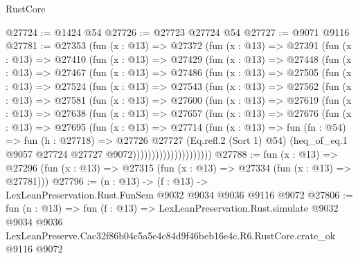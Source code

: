 \begin{lexlean}{RustCore}
\begin{coremodule}
@27724 := @1424 @54
@27726 := @27723 @27724 @54
@27727 := @9071 @9116
@27781 := @27353
    (fun (x : @13) =>
    @27372
      (fun (x : @13) =>
      @27391
        (fun (x : @13) =>
        @27410
          (fun (x : @13) =>
          @27429
            (fun (x : @13) =>
            @27448
              (fun (x : @13) =>
              @27467
                (fun (x : @13) =>
                @27486
                  (fun (x : @13) =>
                  @27505
                    (fun (x : @13) =>
                    @27524
                      (fun (x : @13) =>
                      @27543
                        (fun (x : @13) =>
                        @27562
                          (fun (x : @13) =>
                          @27581
                            (fun (x : @13) =>
                            @27600
                              (fun (x : @13) =>
                              @27619
                                (fun (x : @13) =>
                                @27638
                                  (fun (x : @13) =>
                                  @27657
                                    (fun (x : @13) =>
                                    @27676
                                      (fun (x : @13) =>
                                      @27695
                                        (fun (x : @13) =>
                                        @27714
                                          (fun (x : @13) =>
                                          fun (fn : @54) =>
                                          fun (h : @27718) =>
                                          @27726
                                            @27727
                                            (Eq.refl.{2} (Sort 1) @54)
                                            (heq_of_eq.{1}
                                              @9057
                                              @27724
                                              @27727
                                              @9072)))))))))))))))))))))
@27788 := fun (x : @13) =>
  @27296 (fun (x : @13) => @27315 (fun (x : @13) => @27334 (fun (x : @13) => @27781)))
@27796 := (n : @13) -> (f : @13) -> LexLeanPreservation.Rust.FunSem @9032 @9034 @9036 @9116 @9072
@27806 := fun (n : @13) =>
  fun (f : @13) =>
  LexLeanPreservation.Rust.simulate
    @9032
    @9034
    @9036
    LexLeanPreserve.Cac32f86b04c5a5e4c84d9f46beb16e4c.R6.RustCore.crate_ok
    @9116
    @9072
\end{coremodule}
\end{lexlean}
